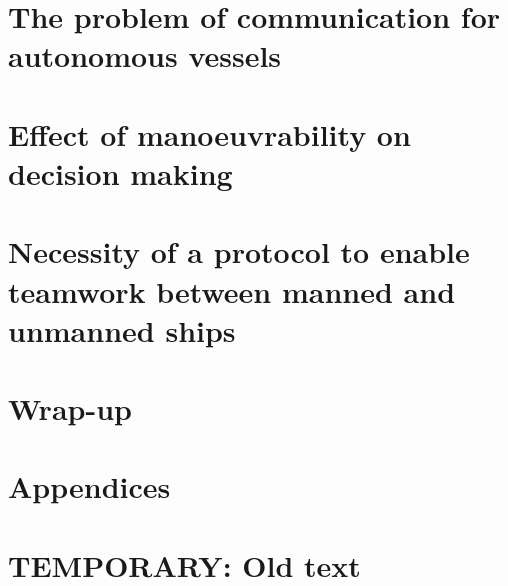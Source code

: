 \documentclass[a4paper,11pt,oneside]{book}
\begin{document}
\frontmatter

\makeCover %

\listoftodos[Notes]
\clearpage




\begin{spacing}{1}
	
	
	\clearpage
	\setcounter{tocdepth}{1}
	
	\tableofcontents
\end{spacing}
\clearpage

\mainmatter



\part{The problem of communication for autonomous vessels}




\part{Effect of manoeuvrability on decision making}
\label{part:MT}





%


\part{Necessity of a protocol to enable teamwork between manned and unmanned ships}
\label{part:CS}





\part{Wrap-up}



\part{Appendices}
\begin{appendices}
	\appendix

	
	
	
	
	
\end{appendices}


\backmatter

\part{TEMPORARY: Old text}





\end{document}
